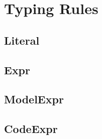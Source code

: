 \documentclass{article}
\begin{document}
\section{Typing Rules}

\subsection{Literal}



\subsection{Expr}



\subsection{ModelExpr}



\subsection{CodeExpr}


\end{document}
